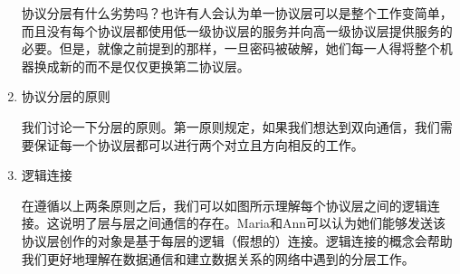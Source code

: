 \begin{enumerate}
	协议分层有什么劣势吗？也许有人会认为单一协议层可以是整个工作变简单，而且没有每个协议层都使用低一级协议层的服务并向高一级协议层提供服务的必要。但是，就像之前提到的那样，一旦密码被破解，她们每一人得将整个机器换成新的而不是仅仅更换第二协议层。
	\item 协议分层的原则

	我们讨论一下分层的原则。第一原则规定，如果我们想达到双向通信，我们需要保证每一个协议层都可以进行两个对立且方向相反的工作。

	\item 逻辑连接

	在遵循以上两条原则之后，我们可以如图所示理解每个协议层之间的逻辑连接。这说明了层与层之间通信的存在。Maria和Ann可以认为她们能够发送该协议层创作的对象是基于每层的逻辑（假想的）连接。逻辑连接的概念会帮助我们更好地理解在数据通信和建立数据关系的网络中遇到的分层工作。

\end{enumerate}
